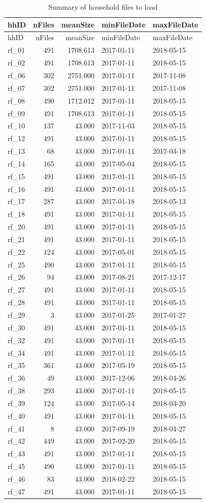 \documentclass[]{article}
\begin{document}
\begin{longtable}[]{@{}lrrll@{}}
\caption{Summary of household files to load}\tabularnewline
\toprule
hhID & nFiles & meanSize & minFileDate & maxFileDate\tabularnewline
\midrule
\endfirsthead
\toprule
hhID & nFiles & meanSize & minFileDate & maxFileDate\tabularnewline
\midrule
\endhead
rf\_01 & 491 & 1708.613 & 2017-01-11 & 2018-05-15\tabularnewline
rf\_02 & 491 & 1708.613 & 2017-01-11 & 2018-05-15\tabularnewline
rf\_06 & 302 & 2751.000 & 2017-01-11 & 2017-11-08\tabularnewline
rf\_07 & 302 & 2751.000 & 2017-01-11 & 2017-11-08\tabularnewline
rf\_08 & 490 & 1712.012 & 2017-01-11 & 2018-05-15\tabularnewline
rf\_09 & 491 & 1708.613 & 2017-01-11 & 2018-05-15\tabularnewline
rf\_10 & 137 & 43.000 & 2017-11-03 & 2018-05-15\tabularnewline
rf\_12 & 491 & 43.000 & 2017-01-11 & 2018-05-15\tabularnewline
rf\_13 & 68 & 43.000 & 2017-01-11 & 2017-03-18\tabularnewline
rf\_14 & 165 & 43.000 & 2017-05-04 & 2018-05-15\tabularnewline
rf\_15 & 491 & 43.000 & 2017-01-11 & 2018-05-15\tabularnewline
rf\_16 & 491 & 43.000 & 2017-01-11 & 2018-05-15\tabularnewline
rf\_17 & 287 & 43.000 & 2017-01-18 & 2018-05-13\tabularnewline
rf\_18 & 491 & 43.000 & 2017-01-11 & 2018-05-15\tabularnewline
rf\_20 & 491 & 43.000 & 2017-01-11 & 2018-05-15\tabularnewline
rf\_21 & 491 & 43.000 & 2017-01-11 & 2018-05-15\tabularnewline
rf\_22 & 124 & 43.000 & 2017-05-01 & 2018-05-15\tabularnewline
rf\_25 & 490 & 43.000 & 2017-01-11 & 2018-05-15\tabularnewline
rf\_26 & 94 & 43.000 & 2017-08-21 & 2017-12-17\tabularnewline
rf\_27 & 491 & 43.000 & 2017-01-11 & 2018-05-15\tabularnewline
rf\_28 & 491 & 43.000 & 2017-01-11 & 2018-05-15\tabularnewline
rf\_29 & 3 & 43.000 & 2017-01-25 & 2017-01-27\tabularnewline
rf\_30 & 491 & 43.000 & 2017-01-11 & 2018-05-15\tabularnewline
rf\_32 & 491 & 43.000 & 2017-01-11 & 2018-05-15\tabularnewline
rf\_34 & 491 & 43.000 & 2017-01-11 & 2018-05-15\tabularnewline
rf\_35 & 361 & 43.000 & 2017-05-19 & 2018-05-15\tabularnewline
rf\_36 & 49 & 43.000 & 2017-12-06 & 2018-04-26\tabularnewline
rf\_38 & 293 & 43.000 & 2017-01-11 & 2018-05-15\tabularnewline
rf\_39 & 124 & 43.000 & 2017-05-14 & 2018-03-20\tabularnewline
rf\_40 & 491 & 43.000 & 2017-01-11 & 2018-05-15\tabularnewline
rf\_41 & 8 & 43.000 & 2017-09-19 & 2018-04-27\tabularnewline
rf\_42 & 449 & 43.000 & 2017-02-20 & 2018-05-15\tabularnewline
rf\_43 & 491 & 43.000 & 2017-01-11 & 2018-05-15\tabularnewline
rf\_45 & 490 & 43.000 & 2017-01-11 & 2018-05-15\tabularnewline
rf\_46 & 83 & 43.000 & 2018-02-22 & 2018-05-15\tabularnewline
rf\_47 & 491 & 43.000 & 2017-01-11 & 2018-05-15\tabularnewline
\bottomrule
\end{longtable}
\end{document}
